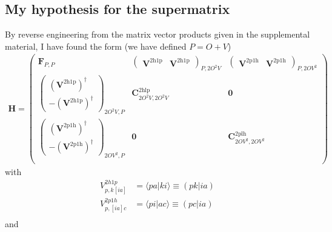 \subsection{My hypothesis for the supermatrix}
By reverse engineering from the matrix vector products given in the supplemental material, I have found the form (we have defined $P=O+V$)
\begin{align}
    \bm{H} = \begin{pmatrix}
\bm{F}_{P,P} & \begin{pmatrix} \bm{V}^{2\mathrm{h1p}} & \bm{V}^{2\mathrm{h1p}} \end{pmatrix}_{P,2O^2V} & \begin{pmatrix} \bm{V}^{2\mathrm{p1h}} & \bm{V}^{2\mathrm{p1h}} \end{pmatrix}_{P,2OV^2}\\
\begin{pmatrix} \left(\bm{V}^{2\mathrm{h1p}}\right)^{\dagger} \\ -\left(\bm{V}^{2\mathrm{h1p}}\right)^{\dagger} \end{pmatrix}_{2O^2V,P} & \bm{C}^{2\mathrm{hlp}}_{2O^2V,2O^2V} & \bm{0} \\
\begin{pmatrix} \left(\bm{V}^{2\mathrm{p1h}}\right)^{\dagger} \\ -\left(\bm{V}^{2\mathrm{p1h}}\right)^{\dagger} \end{pmatrix}_{2OV^2,P} & \bm{0} & \bm{C}^{2\mathrm{plh}}_{2OV^2,2OV^2} \\
\end{pmatrix}
\end{align}
with 
\begin{align}
    V_{p, k[ia]}^{2h1p} &= \langle p a | k i \rangle \equiv (pk|ia) \\
    V_{p, [ia] c}^{2p1h} &= \langle p i | a c \rangle \equiv (pc|ia) \\
\label{c}
\end{align}
and 

